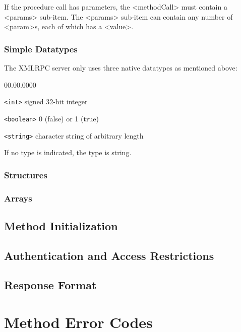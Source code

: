 If the procedure call has parameters, the <methodCall> must contain a <params>
sub-item. The <params> sub-item can contain any number of <param>s, each of
which has a <value>.


\subsubsection{Simple Datatypes}

The XMLRPC server only uses three native datatypes as mentioned above:

\begin{labeling}{00.00.0000}
\item [{\texttt{<int>}}] signed 32-bit integer
\item [{\texttt{<boolean>}}] 0 (false) or 1 (true)
\item [{\texttt{<string>}}] character string of arbitrary length
\end{labeling}

If no type is indicated, the type is string.


\subsubsection{Structures}

\subsubsection{Arrays}

\subsection{Method Initialization}

\subsection{Authentication and Access Restrictions}

\subsection{Response Format}



\section{Method Error Codes}

